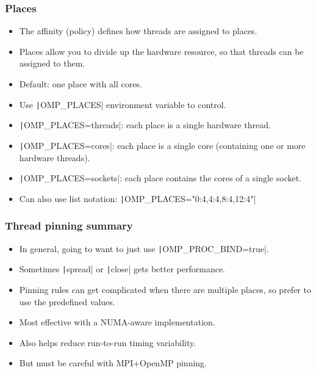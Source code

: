 \documentclass[aspectratio=169]{beamer}
\begin{document}
\begin{frame}
\frametitle{Places}
\begin{itemize}
  \item The affinity (policy) defines how threads are assigned to places.
  \item Places allow you to divide up the hardware resource, so that threads can be assigned to them.
  \item Default: one place with all cores.
  \item Use \texttt|OMP_PLACES| environment variable to control.
  \item \texttt|OMP_PLACES=threads|: each place is a single hardware thread.
  \item \texttt|OMP_PLACES=cores|: each place is a single core (containing one or more hardware threads).
  \item \texttt|OMP_PLACES=sockets|: each place contains the cores of a single socket.
  \item Can also use list notation: \texttt|OMP_PLACES="{0:4},{4:4},{8:4},{12:4}"|
\end{itemize}
\end{frame}

\begin{frame}
\frametitle{Thread pinning summary}
\begin{itemize}
  \item In general, going to want to just use \texttt|OMP_PROC_BIND=true|.
  \item Sometimes \texttt|spread| or \texttt|close| gets better performance.
  \item Pinning rules can get complicated when there are multiple places, so prefer to use the predefined values.
  \item Most effective with a NUMA-aware implementation.
  \item Also helps reduce run-to-run timing variability.
  \item But must be careful with MPI+OpenMP pinning.
\end{itemize}
\end{frame}

\end{document}

